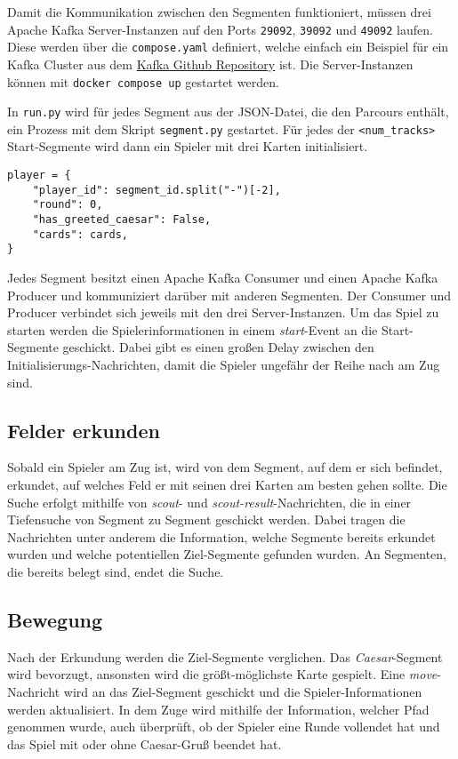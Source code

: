 \documentclass[]{article}
\begin{document}
Damit die Kommunikation zwischen den Segmenten funktioniert, müssen drei Apache Kafka Server-Instanzen auf den Ports \texttt{29092}, \texttt{39092} und \texttt{49092} laufen. Diese werden über die \texttt{compose.yaml} definiert, welche einfach ein Beispiel für ein Kafka Cluster aus dem \href{https://github.com/apache/kafka/blob/trunk/docker/examples/docker-compose-files/cluster/combined/plaintext/docker-compose.yml}{Kafka Github Repository} ist. Die Server-Instanzen können mit \texttt{docker compose up} gestartet werden.\par
In \texttt{run.py} wird für jedes Segment aus der JSON-Datei, die den Parcours enthält, ein Prozess mit dem Skript \texttt{segment.py} gestartet. Für jedes der \texttt{<num\_tracks>} Start-Segmente wird dann ein Spieler mit drei Karten initialisiert.
\begin{verbatim}
player = {
    "player_id": segment_id.split("-")[-2],
    "round": 0,
    "has_greeted_caesar": False,
    "cards": cards,
}
\end{verbatim}
Jedes Segment besitzt einen Apache Kafka Consumer und einen Apache Kafka Producer und kommuniziert darüber mit anderen Segmenten. Der Consumer und Producer verbindet sich jeweils mit den drei Server-Instanzen. Um das Spiel zu starten werden die Spielerinformationen in einem \emph{start}-Event an die Start-Segmente geschickt. Dabei gibt es einen großen Delay zwischen den Initialisierungs-Nachrichten, damit die Spieler ungefähr der Reihe nach am Zug sind.

\subsection{Felder erkunden}
\label{subsec:scouting}

Sobald ein Spieler am Zug ist, wird von dem Segment, auf dem er sich befindet, erkundet, auf welches Feld er mit seinen drei Karten am besten gehen sollte. Die Suche erfolgt mithilfe von \emph{scout}- und \emph{scout-result}-Nachrichten, die in einer Tiefensuche von Segment zu Segment geschickt werden. Dabei tragen die Nachrichten unter anderem die Information, welche Segmente bereits erkundet wurden und welche potentiellen Ziel-Segmente gefunden wurden. An Segmenten, die bereits belegt sind, endet die Suche.

\subsection{Bewegung}
\label{subsec:move}

Nach der Erkundung werden die Ziel-Segmente verglichen. Das \emph{Caesar}-Segment wird bevorzugt, ansonsten wird die größt-möglichste Karte gespielt. Eine \emph{move}-Nachricht wird an das Ziel-Segment geschickt und die Spieler-Informationen werden aktualisiert. In dem Zuge wird mithilfe der Information, welcher Pfad genommen wurde, auch überprüft, ob der Spieler eine Runde vollendet hat und das Spiel mit oder ohne Caesar-Gruß beendet hat.
\end{document}
